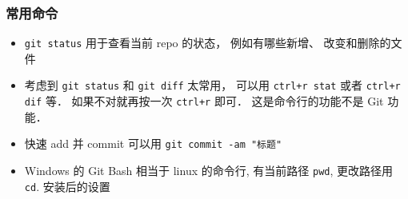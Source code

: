 \subsubsection{常用命令}
\begin{itemize}
\item \verb|git status| 用于查看当前 repo 的状态， 例如有哪些新增、 改变和删除的文件
\item 考虑到 \verb|git status| 和 \verb|git diff| 太常用， 可以用 \verb|ctrl+r stat| 或者 \verb|ctrl+r dif| 等． 如果不对就再按一次 \verb|ctrl+r| 即可． 这是命令行的功能不是 Git 功能．
\item 快速 add 并 commit 可以用 \verb|git commit -am "标题"|
\item Windows 的 Git Bash 相当于 linux 的命令行, 有当前路径 \verb|pwd|, 更改路径用 \verb|cd|.
安装后的设置
\end{itemize}

